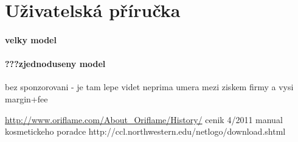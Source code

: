 \documentclass[a4wide,12pt]{report}
\begin{document}
\chapter*{Uživatelská příručka}
\addtocounter{chapter}{1}
\subsubsection{velky model}
\subsubsection{???zjednoduseny model}
bez sponzorovani - je tam lepe videt neprima umera mezi ziskem firmy a vysi margin+fee
\begin{thebibliography}{9}


\end{thebibliography}
\url{http://www.oriflame.com/About_Oriflame/History/}
cenik 4/2011
manual kosmetickeho poradce
http://ccl.northwestern.edu/netlogo/download.shtml
\end{document}
